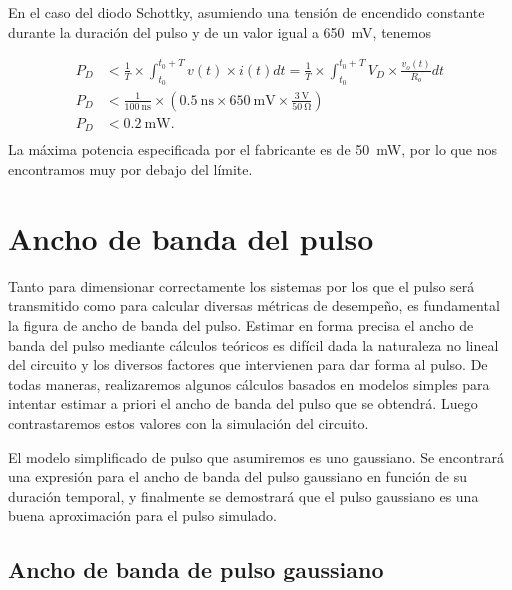 En el caso del diodo Schottky, asumiendo una tensión de encendido constante
durante la duración del pulso y de un valor igual a \qty{650}{\milli\volt},
tenemos

\begin{equation}
    \begin{aligned}
        P_{D} &< \frac{1}{T} \times \int_{t_0}^{t_0+T} v(t) \times i(t) dt =
        \frac{1}{T} \times \int_{t_0}^{t_0+T} V_D \times \frac{v_o(t)}{R_o} dt \\
        P_{D} &< \frac{1}{\qty{100}{\nano\second}} \times \left(
        \qty{0.5}{\nano\second} \times
        \qty{650}{\milli\volt} \times \frac{\qty{3}{\volt}}{
            \qty{50}{\ohm}} \right) \\
        P_{D} &< \qty{0.2}{\milli\watt}. \\
    \end{aligned}
\end{equation}
La máxima potencia especificada por el fabricante es de \qty{50}{\milli\watt},
por lo que nos encontramos muy por debajo del límite.

\section{Ancho de banda del pulso}
\label{sec:pulse_bandwidth}

Tanto para dimensionar correctamente los sistemas por los que el pulso será
transmitido como para calcular diversas métricas de desempeño, es fundamental la
figura de ancho de banda del pulso. Estimar en forma precisa el ancho de banda
del pulso mediante cálculos teóricos es difícil dada la naturaleza no lineal del
circuito y los diversos factores que intervienen para dar forma al pulso. De
todas maneras, realizaremos algunos cálculos basados en modelos simples para
intentar estimar a priori el ancho de banda del pulso que se obtendrá. Luego
contrastaremos estos valores con la simulación del circuito.

El modelo simplificado de pulso que asumiremos es uno gaussiano. Se encontrará
una expresión para el ancho de banda del pulso gaussiano en función de su
duración temporal, y finalmente se demostrará que el pulso gaussiano es una
buena aproximación para el pulso simulado.

\subsection{Ancho de banda de pulso gaussiano}

